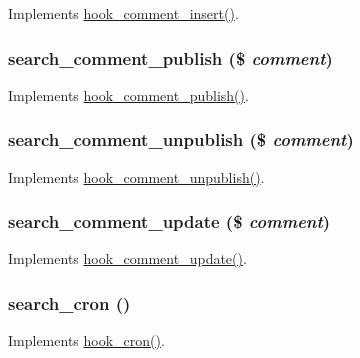 \label{search_8module_ade210f9ad2bba0665dfa46416c4b5377}
Implements \hyperlink{group__hooks_ga3f972e92f09b1c9e8797fc9037e8c75d}{hook\_\-comment\_\-insert()}. \hypertarget{search_8module_a33789acc1f4a944bf59f439e50eda30c}{
\subsubsection[{search\_\-comment\_\-publish}]{\setlength{\rightskip}{0pt plus 5cm}search\_\-comment\_\-publish (\$ {\em comment})}}
\label{search_8module_a33789acc1f4a944bf59f439e50eda30c}
Implements \hyperlink{group__hooks_ga4c4be9019e5cc7f92e8ccc03b595a64b}{hook\_\-comment\_\-publish()}. \hypertarget{search_8module_a6f61fc78d6436593fffa74762fb281b1}{
\subsubsection[{search\_\-comment\_\-unpublish}]{\setlength{\rightskip}{0pt plus 5cm}search\_\-comment\_\-unpublish (\$ {\em comment})}}
\label{search_8module_a6f61fc78d6436593fffa74762fb281b1}
Implements \hyperlink{group__hooks_gaed97e1a1eaedd7b482f881ea2b8a3876}{hook\_\-comment\_\-unpublish()}. \hypertarget{search_8module_a7bafc7986e46077bb7a03f9a5eeb05b2}{
\subsubsection[{search\_\-comment\_\-update}]{\setlength{\rightskip}{0pt plus 5cm}search\_\-comment\_\-update (\$ {\em comment})}}
\label{search_8module_a7bafc7986e46077bb7a03f9a5eeb05b2}
Implements \hyperlink{group__hooks_ga63e0b41e7dbaadbf352b0a9c246d5ae5}{hook\_\-comment\_\-update()}. \hypertarget{search_8module_a60454d8bc91689e5d91b1a8c4e02c412}{
\subsubsection[{search\_\-cron}]{\setlength{\rightskip}{0pt plus 5cm}search\_\-cron ()}}
\label{search_8module_a60454d8bc91689e5d91b1a8c4e02c412}
Implements \hyperlink{group__hooks_gaf07f1e3d98112fc2ba6920cf7ee6fb16}{hook\_\-cron()}.


